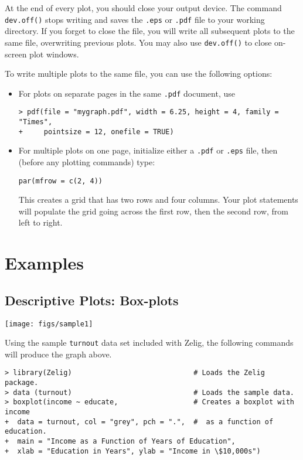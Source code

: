 At the end of every plot, you should close your output device.  The
command \texttt{dev.off()} stops writing and saves the \texttt{.eps}
or {\tt .pdf} file to your working directory.  If you forget to close
the file, you will write all subsequent plots to the same file,
overwriting previous plots.  You may also use \texttt{dev.off()} to close
on-screen plot windows.

To write multiple plots to the same file, you can use the following
options:  
\begin{itemize}
\item For plots on separate pages in the same {\tt .pdf} document, use
\begin{verbatim}
> pdf(file = "mygraph.pdf", width = 6.25, height = 4, family = "Times", 
+     pointsize = 12, onefile = TRUE)
\end{verbatim}
\item For multiple plots on one page, initialize either a {\tt .pdf}
or {\tt .eps} file, then (before any plotting commands) type:  
\begin{verbatim}
par(mfrow = c(2, 4))
\end{verbatim}
This creates a grid that has two rows and four columns.  Your plot
statements will populate the grid going across the first row, then the
second row, from left to right.  
\end{itemize}

\newpage

\section{Examples}

\subsection{Descriptive Plots: Box-plots}

\begin{center}
\texttt{[image: figs/sample1]}
\end{center}
Using the sample \texttt{turnout} data set included with Zelig, the
following commands will produce the graph above.
\begin{verbatim}
> library(Zelig)                             # Loads the Zelig package.
> data (turnout)                             # Loads the sample data.
> boxplot(income ~ educate,                  # Creates a boxplot with income
+  data = turnout, col = "grey", pch = ".",  #  as a function of education.  
+  main = "Income as a Function of Years of Education", 
+  xlab = "Education in Years", ylab = "Income in \$10,000s")
\end{verbatim}


